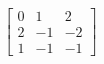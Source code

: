 \begin{displaymath}
 \begin{bmatrix}
  0 & 1 & 2 \\
  2 & -1 & -2 \\
  1 & -1 & -1 
 \end{bmatrix}
\end{displaymath}
